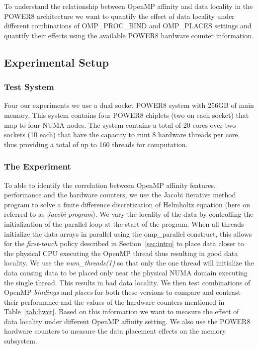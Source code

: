 To understand the relationship between OpenMP affinity and data locality in the POWER8 architecture we want to quantify the effect of data locality under different combinations of OMP\_PROC\_BIND and OMP\_PLACES settings and quantify their effects using the available POWER8 hardware counter information.

\subsection{Experimental Setup}
\subsubsection{Test System}
Four our experiments we use a dual socket POWER8 system with 256GB of main memory. This system contains four POWER8 chiplets (two on each socket) that map to  four NUMA nodes. The system contains a total of 20 cores over two sockets (10 each) that have the capacity to runt 8 hardware threads per core, thus providing a total of up to 160 threads for computation. 

\subsubsection{The Experiment}
To able to identify the correlation between OpenMP affinity features, performance and the hardware counters, we use the Jacobi iterative method program to solve a 
finite difference discretization of Helmholtz equation (here on referred to as \textit{Jacobi program}). We vary the locality of the data by controlling the initialization of the parallel loop at the start of the program. 
When all threads initialize the data arrays in parallel using the omp\_parallel construct, this allows for the 
\textit{first-touch} policy described in Section~\ref{sec:intro} to place data closer to the physical CPU executing the OpenMP thread thus resulting in good data locality. 
We use the \textit{num\_threads(1)} so that only the one thread will initialize the data causing data to be placed only near the physical NUMA domain executing the single thread. This results in bad data locality.
We then test combinations of OpenMP \textit{bindings} and \textit{places} for both these versions to compare and contrast their performance and the values of the hardware counters mentioned in Table~\ref{tab:hwct}. Based on this information we want to measure the effect of data locality under different OpenMP affinity setting. We also use the POWER8 hardware counters to measure the data placement effects on the memory subsystem.

